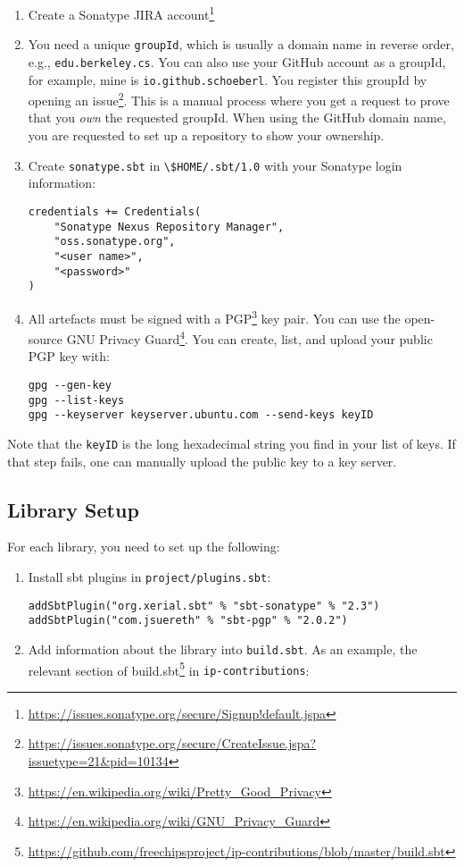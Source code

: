 \documentclass[%
    10pt,
    headinclude, footexclude,
    openright, %
    notitlepage,
    cleardoubleempty,
    headsepline,
    pointlessnumbers,
    bibtotoc, idxtotoc,
    ]{scrbook}
\newcommand{\code}[1]{{\lstinline[basicstyle=\small\ttfamily]{#1}}}
\newcommand{\myref}[2]{\href{#1}{#2}}
\renewcommand{\myref}[2]{{#2}{\footnote{\url{#1}}}}
\begin{document}
\begin{enumerate}
\item Create a \myref{https://issues.sonatype.org/secure/Signup!default.jspa}{Sonatype JIRA account}
\item You need a unique \code{groupId}, which is usually a domain name in reverse order, e.g., \code{edu.berkeley.cs}.
You can also use your GitHub account as a groupId, for example, mine is \code{io.github.schoeberl}. You register this groupId
by opening an \myref{https://issues.sonatype.org/secure/CreateIssue.jspa?issuetype=21&pid=10134}{issue}.
This is a manual process where you get a request to prove that you \emph{own} the requested groupId.
When using the GitHub domain name, you are requested to set up a repository to show your ownership.
\item Create \code{sonatype.sbt} in \code{\$HOME/.sbt/1.0} with your Sonatype login information:
\begin{verbatim}
credentials += Credentials(
    "Sonatype Nexus Repository Manager",
    "oss.sonatype.org",
    "<user name>",
    "<password>"
)
\end{verbatim}
\item All artefacts must be signed with a \myref{https://en.wikipedia.org/wiki/Pretty_Good_Privacy}{PGP} key pair.
You can use the open-source \myref{https://en.wikipedia.org/wiki/GNU_Privacy_Guard}{GNU Privacy Guard}.
You can create, list, and upload your public PGP key with:
\begin{verbatim}
gpg --gen-key
gpg --list-keys
gpg --keyserver keyserver.ubuntu.com --send-keys keyID
\end{verbatim}
\end{enumerate}

Note that the \code{keyID} is the long hexadecimal string you find in your list of keys.
If that step fails, one can manually upload the public key to a key server.

\subsection{Library Setup}

For each library, you need to set up the following:

\begin{enumerate}
\item Install sbt plugins in \code{project/plugins.sbt}:
\begin{verbatim}
addSbtPlugin("org.xerial.sbt" % "sbt-sonatype" % "2.3")
addSbtPlugin("com.jsuereth" % "sbt-pgp" % "2.0.2")
\end{verbatim}
\item Add information about the library into \code{build.sbt}. As an example,
the relevant section of \myref{https://github.com/freechipsproject/ip-contributions/blob/master/build.sbt}{build.sbt}
in \code{ip-contributions}:
\end{enumerate}
\end{document}
